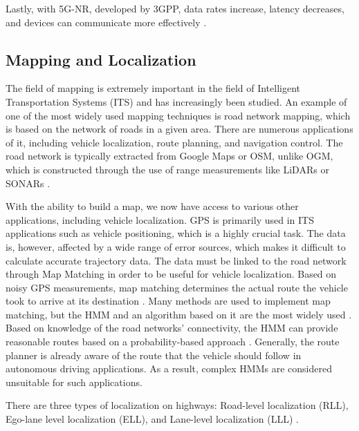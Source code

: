 \documentclass[a4paper,12pt]{article}
\begin{document}
\hspace{5mm} Lastly, with 5G-NR, developed by 3GPP, data rates increase, latency decreases, and devices can communicate more effectively \cite{article24}.



\subsection{Mapping and Localization}

\hspace{5mm} The field of mapping is extremely important in the field of Intelligent Transportation Systems (ITS) and has increasingly been studied. An example of one of the most widely used mapping techniques is road network mapping, which is based on the network of roads in a given area. There are numerous applications of it, including vehicle localization, route planning, and navigation control. The road network is typically extracted from Google Maps or OSM, unlike OGM, which is constructed through the use of range measurements like LiDARs or SONARs \cite{article31}.

\hspace{5mm} With the ability to build a map, we now have access to various other applications, including vehicle localization. GPS is primarily used in ITS applications such as vehicle positioning, which is a highly crucial task. The data is, however, affected by a wide range of error sources, which makes it difficult to calculate accurate trajectory data. The data must be linked to the road network through Map Matching in order to be useful for vehicle localization. Based on noisy GPS measurements, map matching determines the actual route the vehicle took to arrive at its destination \cite{article31}. Many methods are used to implement map matching, but the HMM and an algorithm based on it are the most widely used \cite{article31}. Based on knowledge of the road networks' connectivity, the HMM can provide reasonable routes based on a probability-based approach \cite{article31}. Generally, the route planner is already aware of the route that the vehicle should follow in autonomous driving applications. As a result, complex HMMs are considered unsuitable for such applications.

\hspace{5mm} There are three types of localization on highways: Road-level localization (RLL), Ego-lane level localization (ELL), and Lane-level localization (LLL) \cite{article32}.
\end{document}
